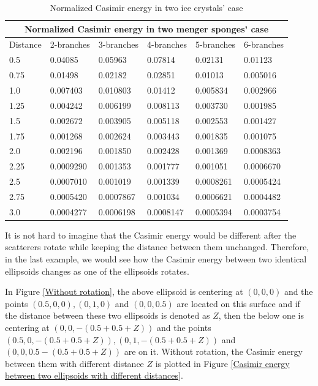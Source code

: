     \begin{table}[H]
        \centering
        \begin{tabular}{ |p{2cm}||p{2cm}|p{2cm}|p{2cm}|p{2cm}|p{2cm}|  }
            \hline
            \multicolumn{6}{|c|}{Normalized Casimir energy in two menger sponges' case} \\
            \hline
            Distance & 2-branches & 3-branches & 4-branches & 5-branches & 6-branches\\
            \hline
            0.5   & 0.04085    & 0.05963    & 0.07814  & 0.02131    & 0.01123\\
            0.75  & 0.01498    & 0.02182    & 0.02851  & 0.01013    & 0.005016\\
            1.0   & 0.007403   & 0.010803   & 0.01412  & 0.005834    & 0.002966\\
            1.25  & 0.004242   & 0.006199   & 0.008113 & 0.003730    & 0.001985\\
            1.5   & 0.002672   & 0.003905   & 0.005118 & 0.002553    & 0.001427\\
            1.75  & 0.001268   & 0.002624   & 0.003443 & 0.001835    & 0.001075\\
            2.0   & 0.002196   & 0.001850   & 0.002428 & 0.001369   & 0.0008363\\
            2.25  & 0.0009290  & 0.001353   & 0.001777 & 0.001051    & 0.0006670\\
            2.5   & 0.0007010  & 0.001019   & 0.001339 & 0.0008261    & 0.0005424\\
            2.75  & 0.0005420  & 0.0007867  & 0.001034 & 0.0006621    & 0.0004482\\
            3.0   & 0.0004277  & 0.0006198  & 0.0008147 & 0.0005394    & 0.0003754\\
            \hline
           \end{tabular}
           \caption{\label{Normalized Casimir energy in ice crystals' case table} Normalized Casimir energy in two ice crystals' case}
        \end{table}
It is not hard to imagine that the Casimir energy would be different after the scatterers rotate while keeping the distance between them unchanged. Therefore, 
in the last example, we would see how the Casimir energy between two identical ellipsoids changes as one of the ellipsoids rotates.

In Figure \ref{Without rotation}, the above ellipsoid is centering at $(0,0,0)$ and 
the points $(0.5, 0, 0), (0, 1, 0)$ and $(0, 0, 0.5)$ are located on this surface and if the distance between these two ellipsoids is denoted as $Z$, then the below one
is centering at $(0, 0, -(0.5+0.5+Z))$ and the points $(0.5, 0, -(0.5+0.5+Z)), (0, 1, -(0.5+0.5+Z))$ and $(0, 0, 0.5-(0.5+0.5+Z))$ are on it. Without rotation, 
the Casimir energy between them with different distance $Z$ is plotted in Figure \ref{Casimir energy between two ellipsoids with different distances}.

